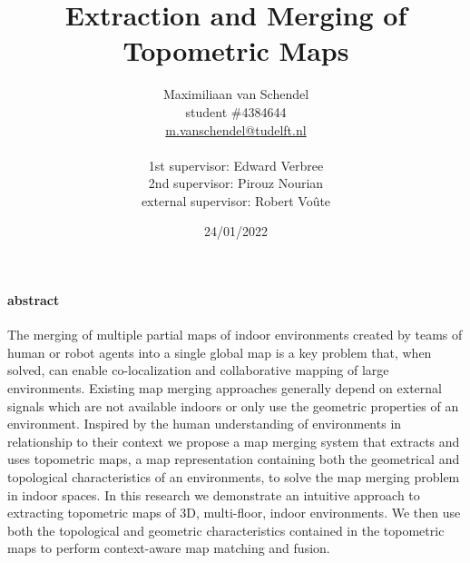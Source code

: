 \documentclass{article}
\title{Extraction and Merging of Topometric Maps}
\author{
  Maximiliaan van Schendel\\
  student \#4384644 \\
  \url{m.vanschendel@tudelft.nl}\\
  \\
  1st supervisor: Edward Verbree \\
  2nd supervisor: Pirouz Nourian \\
  external supervisor: Robert Voûte \\
}
\date{24/01/2022}
\begin{document}


\maketitle
\pagebreak

\tableofcontents
\newpage



\paragraph{abstract}
The merging of multiple partial \gls{map}s of indoor environments created by teams of human or robot agents into a single global map is a key problem that, when solved, can enable co-localization and collaborative mapping of large environments. Existing map merging approaches generally depend on external signals which are not available indoors or only use the  geometric properties of an environment. Inspired by the human understanding of environments in relationship to their context we propose a map merging system that extracts and uses topometric maps, a map representation containing both the geometrical and topological characteristics of an environments, to solve the map merging problem in indoor spaces. In this research we demonstrate an intuitive approach to extracting topometric maps of 3D, multi-floor, indoor environments. We then use both the topological and geometric characteristics contained in the topometric maps to perform context-aware map matching and fusion. 





\pagebreak

\pagebreak

\pagebreak                                                     

\pagebreak







\clearpage
\printglossaries
\end{document}
